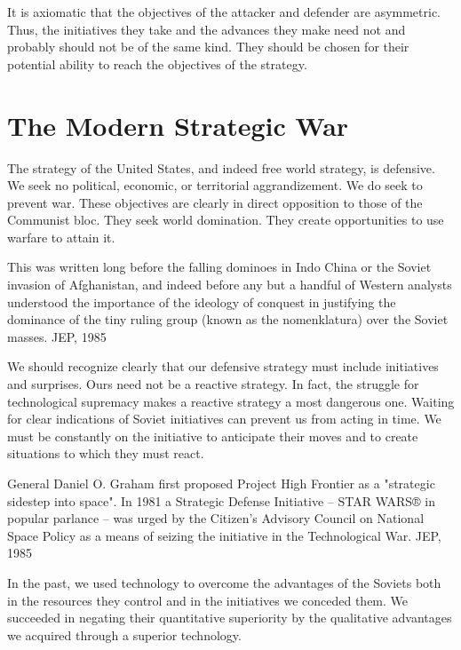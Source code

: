 It is axiomatic that the objectives of the attacker and defender are asymmetric. Thus, the initiatives they take and the advances they make need not and probably should not be of the same kind. They should be chosen for their potential ability to reach the objectives of the strategy.

\section{The Modern Strategic War}
The strategy of the United States, and indeed free world strategy, is defensive. We seek no political, economic, or territorial aggrandizement. We do seek to prevent war. These objectives are clearly in direct opposition to those of the Communist bloc. They seek world domination. They create opportunities to use warfare to attain it.

\begin{mdframed}[backgroundcolor=black!10]
This was written long before the falling dominoes in Indo China or the Soviet invasion of Afghanistan, and indeed before any but a handful of Western analysts understood the importance of the ideology of conquest in justifying the dominance of the tiny ruling group (known as the nomenklatura) over the Soviet masses. JEP, 1985
\end{mdframed}

We should recognize clearly that our defensive strategy must include initiatives and surprises. Ours need not be a reactive strategy. In fact, the struggle for technological supremacy makes a reactive strategy a most dangerous one. Waiting for clear indications of Soviet initiatives can prevent us from acting in time. We must be constantly on the initiative to anticipate their moves and to create situations to which they must react.

\begin{mdframed}[backgroundcolor=black!10]
General Daniel O. Graham first proposed Project High Frontier as a "strategic sidestep into space". In 1981 a Strategic Defense Initiative -- STAR WARS® in popular parlance -- was urged by the Citizen's Advisory Council on National Space Policy as a means of seizing the initiative in the Technological War. JEP, 1985
\end{mdframed}

In the past, we used technology to overcome the advantages of the Soviets both in the resources they control and in the initiatives we conceded them. We succeeded in negating their quantitative superiority by the qualitative advantages we acquired through a superior technology.

